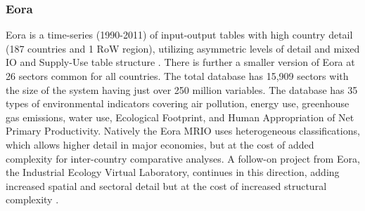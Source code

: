 \subsubsection{Eora}


Eora is a time-series (1990-2011) of input-output tables with high country detail (187 countries and 1 RoW region), utilizing asymmetric levels of detail and mixed IO and Supply-Use table structure \cite{Lenzen_2012, Lenzen_2013}. There is further a smaller version of Eora at 26 sectors common for all countries. The total database has 15,909 sectors with the size of the system having just over 250 million variables. The database has 35 types of environmental indicators covering air pollution, energy use, greenhouse gas emissions, water use, Ecological Footprint, and Human Appropriation of Net Primary Productivity. Natively the Eora MRIO uses heterogeneous classifications, which allows higher detail in major economies, but at the cost of added complexity for inter-country comparative analyses. A follow-on project from Eora, the Industrial Ecology Virtual Laboratory, continues in this direction, adding increased spatial and sectoral detail but at the cost of increased structural complexity \cite{Lenzen_2014}.

  